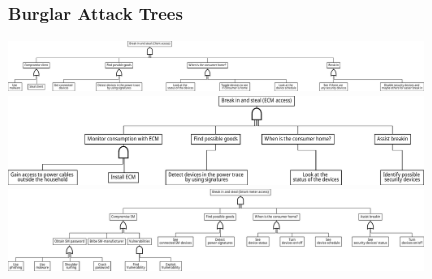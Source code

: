 \begin{frame}\frametitle{Burglar Attack Trees}
\centering
\includegraphics[width=11cm]{graphics/burglarClient}\\\vspace{0.5cm}
\includegraphics[width=11cm]{graphics/burglarECM}\\\vspace{0.5cm}
\includegraphics[width=11cm]{graphics/burglarSM}
\end{frame}





